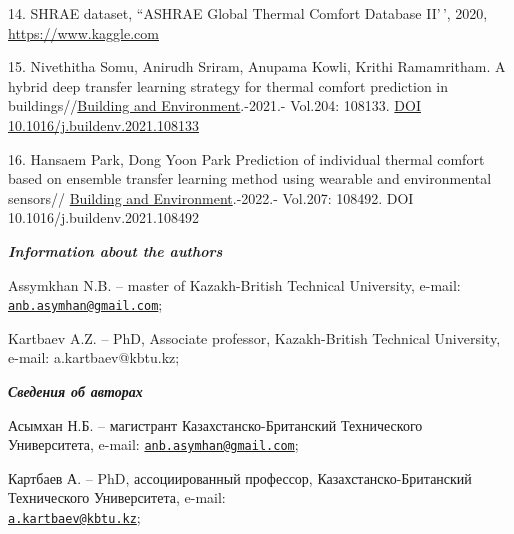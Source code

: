 \begin{references}
14. SHRAE dataset, ``ASHRAE Global Thermal Comfort Database II'\,',
2020, \href{https://www.kaggle.com/datasets/claytonmiller/ashrae-global-thermal-comfort-database-ii}{https://www.kaggle.com}

15. Nivethitha Somu, Anirudh Sriram, Anupama Kowli, Krithi Ramamritham.
A hybrid deep transfer learning strategy for thermal comfort prediction
in
buildings//\href{https://www.sciencedirect.com/journal/building-and-environment}{Building
and Environment}.-2021.- Vol.204: 108133.
\href{https://doi.org/10.1016/j.buildenv.2021.108133}{DOI
10.1016/j.buildenv.2021.108133}

16. Hansaem Park, Dong Yoon Park Prediction of individual thermal
comfort based on ensemble transfer learning method using wearable and
environmental sensors//
\href{https://www.sciencedirect.com/journal/building-and-environment}{Building
and Environment}.-2022.- Vol.207: 108492. DOI
10.1016/j.buildenv.2021.108492
\end{references}

\begin{authorinfo}
\hspace{1em}\emph{{\bfseries Information about the authors}}

Assymkhan N.B. -- master of Kazakh-British Technical University, e-mail:
\href{mailto:anb.asymhan@gmail.com}{\nolinkurl{anb.asymhan@gmail.com}};

Kartbaev A.Z. -- PhD, Associate professor, Kazakh-British Technical University, e-mail:
a.kartbaev@kbtu.kz;

\hspace{1em}\emph{{\bfseries Сведения об авторах}}

Асымхан Н.Б. -- магистрант Казахстанско-Британский Технического
Университета, e-mail:
\href{mailto:anb.asymhan@gmail.com}{\nolinkurl{anb.asymhan@gmail.com}};

Картбаев А. -- PhD, ассоциированный профессор, Казахстанско-Британский Технического Университета,
e-mail:
\\\href{mailto:a.kartbaev@kbtu.kz}{\nolinkurl{a.kartbaev@kbtu.kz}};
\end{authorinfo}
